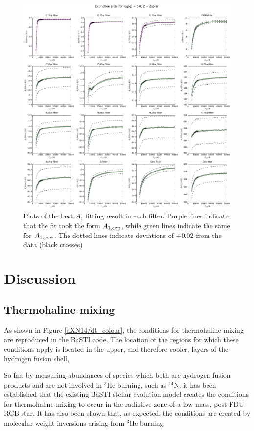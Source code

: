 \documentclass[12pt, a4paper]{report}
\begin{document}
\begin{figure}
\includegraphics[scale=0.4]{../HubWFC/Hub_graphs/AHub_logg=5p0_solar_4500K_R1_only_Teff_fit_modded_plot.pdf}
\caption{Plots of the best $A_{1}$ fitting result in each filter. Purple lines indicate that the fit took the form $A_{1,\textnormal{exp}}$, while green lines indicate the same for $A_{1,\textnormal{pow}}$. The dotted lines indicate deviations of $\pm$0.02 from the data (black crosses)}
\label{R1_bests}
\end{figure}


\chapter{Discussion}
\section{Thermohaline mixing}
As shown in Figure \ref{dXN14/dt_colour}, the conditions for thermohaline mixing are reproduced in the BaSTI code. The location of the regions for which these conditions apply is located in the upper, and therefore cooler, layers of the hydrogen fusion shell,

So far, by measuring abundances of species which both are hydrogen fusion products and are not involved in $^{3}$He burning, such as $^{14}$N, it has been established that the existing BaSTI stellar evolution model creates the conditions for thermohaline mixing to occur in the radiative zone of a low-mass, post-FDU RGB star. It has also been shown that, as expected, the conditions are created by molecular weight inversions arising from $^{3}$He burning.
\end{document}
